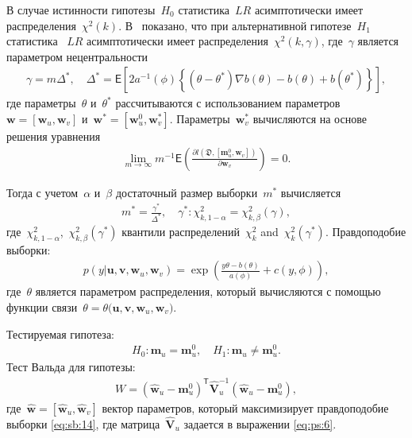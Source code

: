 В случае истинности гипотезы~$H_0$ статистика~$LR$ асимптотически имеет распределения~$\chi^2(k)$.  В~\cite{shieh2000} показано, что при альтернативной гипотезе~$H_1$ статистика ~$LR$ асимптотически имеет распределения~$\chi^2(k,\gamma)$, где~$\gamma$ является параметром нецентральности
\[
\label{eq:sb:11}
\begin{aligned}
	\gamma = m\Delta^*, \quad \Delta^* = \mathsf{E}\left[2a^{-1}(\phi)\left\{\left(\theta - \theta^*\right)\nabla b(\theta) - b(\theta) + b(\theta^*)\right\}\right], 
\end{aligned}
\]
где параметры~$\theta$ и~$\theta^*$ рассчитываются с использованием параметров~$\textbf{w} = [\textbf{w}_{u}, \textbf{w}_{v}]$ и~$\textbf{w}^* = [\textbf{w}^{0}_{u}, \textbf{w}^{*}_{v}]$. Параметры~$\textbf{w}^{*}_{v}$ вычисляются на основе решения уравнения
\[
\label{eq:sb:12}
\begin{aligned}
	\lim_{m\to\infty}m^{-1}\mathsf{E}\left(\frac{\partial l\left(\mathfrak{D}, \left[\textbf{m}^{0}_{u}, \textbf{w}_{v}\right]\right)}{\partial \textbf{w}_{v}}\right) = 0.
\end{aligned}
\]
	
Тогда с учетом~$\alpha$ и~$\beta$ достаточный размер выборки~$m^*$ вычисляется
\[
\label{eq:sb:13}
\begin{aligned}
	m^* = \frac{\gamma^*}{\Delta^*}, \quad \gamma^*:\chi^2_{k, 1-\alpha} = \chi^2_{k, \beta}\left(\gamma\right), 
\end{aligned}
\]
где~$\chi^2_{k, 1-\alpha}$,~$\chi^2_{k, \beta}\left(\gamma^*\right)$ квантили распределений~$\chi^{2}_k$ and~$\chi^2_{k}\left(\gamma^*\right)$.
Правдоподобие выборки:
\[
\label{eq:sb:14}
\begin{aligned}
	p(y|\textbf{u},\textbf{v},\textbf{w}_{u},\textbf{w}_{v}) = \exp\left(\frac{y\theta- b(\theta)}{a(\phi)} + c\left(y, \phi\right)\right),
\end{aligned}
\]
где~$\theta$ является параметром распределения, который вычисляются с помощью функции связи~$\theta=\theta\bigr(\textbf{u},\textbf{v},\textbf{w}_{u},\textbf{w}_{v}\bigr)$.

Тестируемая гипотеза:
\[
\label{eq:sb:15}
\begin{aligned}
	H_0: \textbf{m}_{u} = \textbf{m}_{u}^{0}, \quad H_1: \textbf{m}_{u} \not=\textbf{m}_{u}^{0}.
\end{aligned}
\]
Тест Вальда для гипотезы:
\[
\label{eq:sb:16}
\begin{aligned}
	W = \left(\hat{\textbf{w}}_{u} - \textbf{m}_{u}^{0}\right)^{\mathsf{T}}\hat{\textbf{V}}_{u}^{-1}\left(\hat{\textbf{w}}_{u} - \textbf{m}_{u}^{0}\right),
\end{aligned}
\]
где~$\hat{\textbf{w}} = [\hat{\textbf{w}}_{u},\hat{\textbf{w}}_{v}]$ вектор параметров, который максимизирует правдоподобие выборки \eqref{eq:sb:14}, где матрица~$\hat{\textbf{V}}_u$ задается в выражении \eqref{eq:ps:6}.

